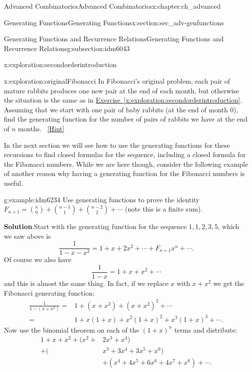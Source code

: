 \documentclass[oneside,10pt,]{book}
\numberwithin{equation}{chapter}
\newcommand{\amp}{&}
\begin{document}
\begin{chapterptx}{Advanced Combinatorics}{}{Advanced Combinatorics}{}{}{x:chapter:ch_advanced}
\begin{sectionptx}{Generating Functions}{}{Generating Functions}{}{}{x:section:sec_adv-genfunctions}
\begin{subsectionptx}{Generating Functions and Recurrence Relations}{}{Generating Functions and Recurrence Relations}{}{}{g:subsection:idm6043}
\begin{exploration}{}{x:exploration:secondorderintroduction}
\end{exploration}
\begin{exploration}{}{x:exploration:originalFibonacci}%
In Fibonacci's original problem, each pair of mature rabbits produces one new pair at the end of each month, but otherwise the situation is the same as in \hyperref[x:exploration:secondorderintroduction]{Exercise~\ref{x:exploration:secondorderintroduction}}.  Assuming that we start with one pair of baby rabbits (at the end of month 0), find the generating function for the number of pairs of rabbits we have at the end of \(n\) months.%
\qquad~\hfill{\tiny\hyperlink{g:hint:idm6219-back}{[Hint]}}\end{exploration}
In the next section we will see how to use the generating functions for these recursions to find closed formulas for the sequence, including a closed formula for the Fibonacci numbers.  While we are here though, consider the following example of another reason why having a generating function for the Fibonacci numbers is useful.%
\begin{example}{}{g:example:idm6234}%
Use generating functions to prove the identity \(F_{n+1} = \binom{n}{0} + \binom{n-1}{1} + \binom{n-2}{2} + \cdots \) (note this is a finite sum).%
\par\smallskip%
\noindent\textbf{Solution}.\hypertarget{g:solution:idm6238}{}\quad{}Start with the generating function for the sequence \(1, 1, 2, 3, 5\), which we saw above is%
\begin{equation*}
\frac{1}{1-x-x^2} = 1 + x + 2x^2 + \cdots + F_{n+1}x^n+ \cdots\text{.}
\end{equation*}
Of course we also have%
\begin{equation*}
\frac{1}{1-x} = 1 + x + x^2 + \cdots
\end{equation*}
and this is almost the same thing.  In fact, if we replace \(x\) with \(x+x^2\) we get the Fibonacci generating function:%
\begin{align*}
\frac{1}{1-(x+x^2)} = \amp 1 + (x+x^2) + (x+x^2)^2 + \cdots \\
= \amp 1 + x(1+x) + x^2(1+x)^2 + x^3(1+x)^3 + \cdots\text{.}
\end{align*}
Now use the binomial theorem on each of the \((1+x)^n\) terms and distribute:%
\begin{align*}
1 + x + x^2 + (x^2 +\amp 2x^3 + x^4)\\
+ (\amp x^3 + 3x^4 + 3x^5 + x^6)\\
\amp + (x^4 + 4x^5 + 6x^6 + 4x^7 + x^8) + \cdots \text{.}
\end{align*}

\end{example}
\end{subsectionptx}
\end{sectionptx}
\end{chapterptx}
\end{document}
